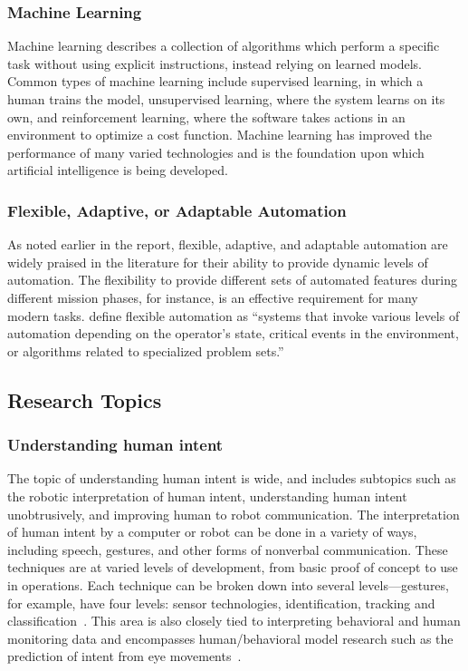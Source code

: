 \subsubsection{Machine Learning}
Machine learning describes a collection of algorithms which perform a specific task without using explicit instructions, instead relying on learned models.
Common types of machine learning include supervised learning, in which a human trains the model, unsupervised learning, where the system learns on its own, and reinforcement learning, where the software takes actions in an environment to optimize a cost function.
Machine learning has improved the performance of many varied technologies and is the foundation upon which artificial intelligence is being developed.

\subsubsection{Flexible, Adaptive, or Adaptable Automation}
As noted earlier in the report, flexible, adaptive, and adaptable automation are widely praised in the literature for their ability to provide dynamic levels of automation.
The flexibility to provide different sets of automated features during different mission phases, for instance, is an effective requirement for many modern tasks.
\citeauthor{chen_humanagent_2014} define flexible automation as ``systems that invoke various levels of automation depending on the operator's state, critical events in the environment, or algorithms related to specialized problem sets.''

\subsection{Research Topics}
\subsubsection{Understanding human intent}
The topic of understanding human intent is wide, and includes subtopics such as the robotic interpretation of human intent, understanding human intent unobtrusively, and improving human to robot communication.
The interpretation of human intent by a computer or robot can be done in a variety of ways, including speech, gestures, and other forms of nonverbal communication.
These techniques are at varied levels of development, from basic proof of concept to use in operations.
Each technique can be broken down into several levels—gestures, for example, have four levels: sensor technologies, identification, tracking and classification~\citep{liu_gesture_2018}.
This area is also closely tied to interpreting behavioral and human monitoring data and encompasses human/behavioral model research such as the prediction of intent from eye movements~\citep{Singh:2018:CPG:3237383.3237457, ruhland_review_2015}.

